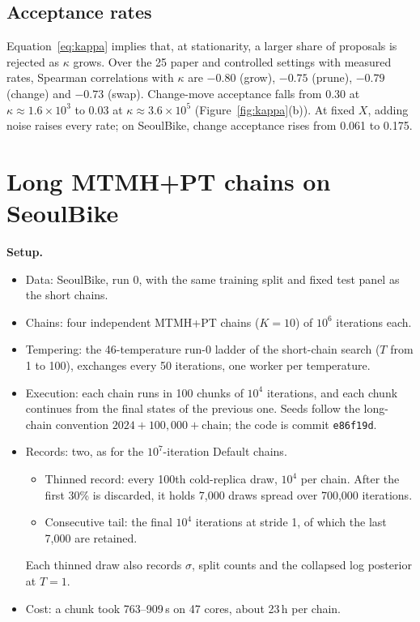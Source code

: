 \documentclass[11pt]{article}
\begin{document}
\subsection{Acceptance rates}
Equation~\eqref{eq:kappa} implies that, at stationarity, a larger share of proposals is rejected as $\kappa$ grows. Over the 25 paper and controlled settings with measured rates, Spearman correlations with $\kappa$ are $-0.80$ (grow), $-0.75$ (prune), $-0.79$ (change) and $-0.73$ (swap). Change-move acceptance falls from 0.30 at $\kappa\approx1.6\times10^3$ to 0.03 at $\kappa\approx3.6\times10^5$ (Figure~\ref{fig:kappa}(b)). At fixed $X$, adding noise raises every rate; on SeoulBike, change acceptance rises from 0.061 to 0.175.

\section{Long MTMH+PT chains on SeoulBike}
\label{sec:long-pt}
\textbf{Setup.}
\begin{itemize}
\item Data: SeoulBike, run 0, with the same training split and fixed test panel as the short chains.
\item Chains: four independent MTMH+PT chains ($K=10$) of $10^6$ iterations each.
\item Tempering: the 46-temperature run-0 ladder of the short-chain search ($T$ from 1 to 100), exchanges every 50 iterations, one worker per temperature.
\item Execution: each chain runs in 100 chunks of $10^4$ iterations, and each chunk continues from the final states of the previous one. Seeds follow the long-chain convention $2024+100{,}000+\text{chain}$; the code is commit \texttt{e86f19d}.
\item Records: two, as for the $10^7$-iteration Default chains.
\begin{itemize}
\item Thinned record: every 100th cold-replica draw, $10^4$ per chain. After the first 30\% is discarded, it holds 7,000 draws spread over 700,000 iterations.
\item Consecutive tail: the final $10^4$ iterations at stride 1, of which the last 7,000 are retained.
\end{itemize}
Each thinned draw also records $\sigma$, split counts and the collapsed log posterior at $T=1$.
\item Cost: a chunk took 763--909\,s on 47 cores, about 23\,h per chain.
\end{itemize}
\end{document}
